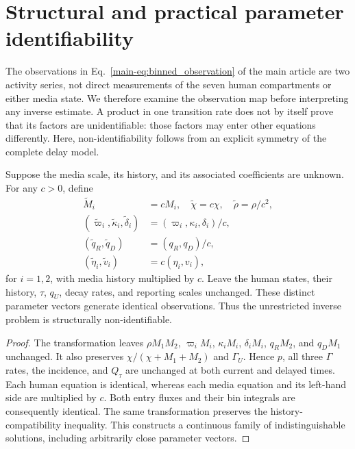 \section{Structural and practical parameter identifiability}
\label{sec:identifiability}
The observations in Eq.~\eqref{main-eq:binned_observation} of the main article are two activity series, not direct measurements of the seven human compartments or either media state. We therefore examine the observation map before interpreting any inverse estimate. A product in one transition rate does not by itself prove that its factors are unidentifiable: those factors may enter other equations differently. Here, non-identifiability follows from an explicit symmetry of the complete delay model.

\begin{theorem}
\label{thm:media_scale}
Suppose the media scale, its history, and its associated coefficients are unknown. For any $c>0$, define
\begin{equation}
\begin{aligned}
\widetilde M_i&=cM_i,\quad\widetilde\chi=c\chi,\quad\widetilde\rho=\rho/c^2,\\
(\widetilde\varpi_i,\widetilde\kappa_i,\widetilde\delta_i)
  &=(\varpi_i,\kappa_i,\delta_i)/c,\\
(\widetilde q_R,\widetilde q_D)&=(q_R,q_D)/c,\\
(\widetilde\eta_i,\widetilde v_i)&=c(\eta_i,v_i),
\end{aligned}
\label{eq:media_symmetry}
\end{equation}
for $i=1,2$, with media history multiplied by $c$. Leave the human states, their history, $\tau$, $q_U$, decay rates, and reporting scales unchanged. These distinct parameter vectors generate identical observations. Thus the unrestricted inverse problem is structurally non-identifiable.
\end{theorem}
\begin{proof}
The transformation leaves $\rho M_1M_2$, $\varpi_iM_i$, $\kappa_iM_i$, $\delta_iM_i$, $q_RM_2$, and $q_DM_1$ unchanged. It also preserves $\chi/(\chi+M_1+M_2)$ and $\Gamma_U$. Hence $p$, all three $\Gamma$ rates, the incidence, and $Q_\tau$ are unchanged at both current and delayed times. Each human equation is identical, whereas each media equation and its left-hand side are multiplied by $c$. Both entry fluxes and their bin integrals are consequently identical. The same transformation preserves the history-compatibility inequality. This constructs a continuous family of indistinguishable solutions, including arbitrarily close parameter vectors.
\end{proof}

